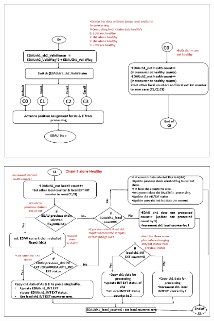 \begin{figure}[H]
	\centering
	\includegraphics[width=\linewidth]{./FlowCharts/PngFlowCharts/EDAU5.png}
\end{figure}


\begin{figure}[H]
	\centering
	\includegraphics[width=\linewidth]{./FlowCharts/PngFlowCharts/EDAU6.png}
\end{figure}


